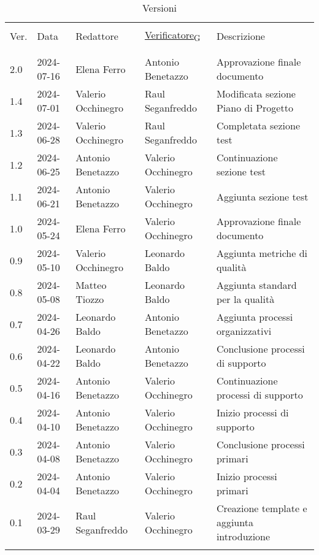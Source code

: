 \documentclass[italian,12pt]{article} %
\begin{document}
 



\newpage



\begin{table}[!h]
	\caption*{Versioni}
	\footnotesize
	\begin{center}
		\begin{tabular}{ l l l l p{6cm} }
			\hline                                                                                                   \\[-2ex]
			Ver. & Data       & Redattore          & \href{https://7last.github.io/docs/pb/documentazione-interna/glossario\#verificatore}{Verificatore\textsubscript{G}}       & Descrizione\\
			\\[-2ex] \hline \\[-1.5ex]
			2.0  & 2024-07-16 & Elena Ferro        & Antonio Benetazzo  & Approvazione finale documento \\
			1.4	 & 2024-07-01 & Valerio Occhinegro & Raul Seganfreddo   & Modificata sezione Piano di Progetto \\
			1.3	 & 2024-06-28 & Valerio Occhinegro & Raul Seganfreddo   & Completata sezione test \\
			1.2  & 2024-06-25 & Antonio Benetazzo  & Valerio Occhinegro & Continuazione sezione test \\
			1.1  & 2024-06-21 & Antonio Benetazzo  & Valerio Occhinegro & Aggiunta sezione test \\
			1.0  & 2024-05-24 & Elena Ferro        & Valerio Occhinegro & Approvazione finale documento \\
			0.9  & 2024-05-10 & Valerio Occhinegro & Leonardo Baldo     & Aggiunta metriche di qualità \\
			0.8  & 2024-05-08 & Matteo Tiozzo      & Leonardo Baldo     & Aggiunta standard per la qualità \\
			0.7  & 2024-04-26 & Leonardo Baldo     & Antonio Benetazzo  & Aggiunta processi organizzativi \\
			0.6  & 2024-04-22 & Leonardo Baldo     & Antonio Benetazzo  & Conclusione processi di supporto \\
			0.5  & 2024-04-16 & Antonio Benetazzo  & Valerio Occhinegro & Continuazione processi di supporto \\
			0.4  & 2024-04-10 & Antonio Benetazzo  & Valerio Occhinegro & Inizio processi di supporto \\
			0.3  & 2024-04-08 & Antonio Benetazzo  & Valerio Occhinegro & Conclusione processi primari \\
			0.2  & 2024-04-04 & Antonio Benetazzo  & Valerio Occhinegro & Inizio processi primari \\
			0.1  & 2024-03-29 & Raul Seganfreddo   & Valerio Occhinegro & Creazione template e aggiunta introduzione \\
			\\[-1.5ex] \hline
		\end{tabular}
	\end{center}
\end{table}
\end{document}
